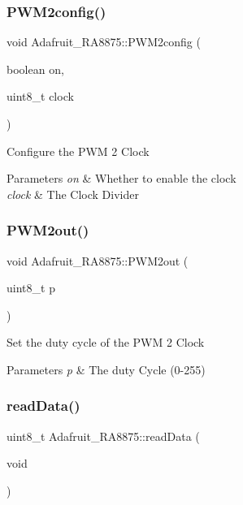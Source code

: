 \subsubsection{\texorpdfstring{PWM2config()}{PWM2config()}}
{\footnotesize\ttfamily void Adafruit\+\_\+\+R\+A8875\+::\+P\+W\+M2config (\begin{DoxyParamCaption}\item[{boolean}]{on,  }\item[{uint8\+\_\+t}]{clock }\end{DoxyParamCaption})}

Configure the P\+WM 2 Clock


\begin{DoxyParams}{Parameters}
{\em on} & Whether to enable the clock \\
\hline
{\em clock} & The Clock Divider \\
\hline
\end{DoxyParams}
\mbox{\label{class_adafruit___r_a8875_aaabcf8278287f64c28112fb976335c26}} 
\subsubsection{\texorpdfstring{PWM2out()}{PWM2out()}}
{\footnotesize\ttfamily void Adafruit\+\_\+\+R\+A8875\+::\+P\+W\+M2out (\begin{DoxyParamCaption}\item[{uint8\+\_\+t}]{p }\end{DoxyParamCaption})}

Set the duty cycle of the P\+WM 2 Clock


\begin{DoxyParams}{Parameters}
{\em p} & The duty Cycle (0-\/255) \\
\hline
\end{DoxyParams}
\mbox{\label{class_adafruit___r_a8875_a7771753841f0390793b69421ef86ffb6}} 
\subsubsection{\texorpdfstring{readData()}{readData()}}
{\footnotesize\ttfamily uint8\+\_\+t Adafruit\+\_\+\+R\+A8875\+::read\+Data (\begin{DoxyParamCaption}\item[{void}]{ }\end{DoxyParamCaption})}


